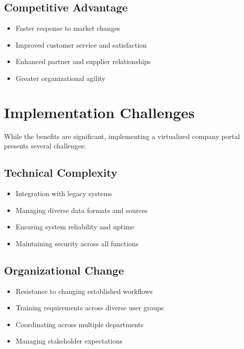 \subsection{Competitive Advantage}

\begin{itemize}
	\item Faster response to market changes
	\item Improved customer service and satisfaction
	\item Enhanced partner and supplier relationships
	\item Greater organizational agility
\end{itemize}

\section{Implementation Challenges}
\label{sec:implementation-challenges}

While the benefits are significant, implementing a virtualized company portal presents several challenges:

\subsection{Technical Complexity}

\begin{itemize}
	\item Integration with legacy systems
	\item Managing diverse data formats and sources
	\item Ensuring system reliability and uptime
	\item Maintaining security across all functions
\end{itemize}

\subsection{Organizational Change}

\begin{itemize}
	\item Resistance to changing established workflows
	\item Training requirements across diverse user groups
	\item Coordinating across multiple departments
	\item Managing stakeholder expectations
\end{itemize}

